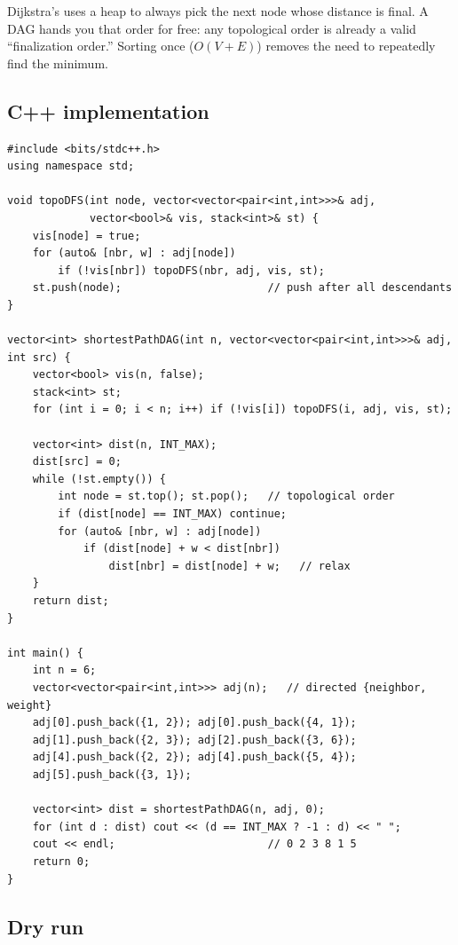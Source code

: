 \begin{ideabox}
Dijkstra's uses a heap to always pick the next node whose distance is
final. A DAG hands you that order for free: any topological order is
already a valid ``finalization order.'' Sorting once ($O(V+E)$) removes
the need to repeatedly find the minimum.
\end{ideabox}

\subsection*{C++ implementation}

\begin{lstlisting}
#include <bits/stdc++.h>
using namespace std;

void topoDFS(int node, vector<vector<pair<int,int>>>& adj,
             vector<bool>& vis, stack<int>& st) {
    vis[node] = true;
    for (auto& [nbr, w] : adj[node])
        if (!vis[nbr]) topoDFS(nbr, adj, vis, st);
    st.push(node);                       // push after all descendants
}

vector<int> shortestPathDAG(int n, vector<vector<pair<int,int>>>& adj, int src) {
    vector<bool> vis(n, false);
    stack<int> st;
    for (int i = 0; i < n; i++) if (!vis[i]) topoDFS(i, adj, vis, st);

    vector<int> dist(n, INT_MAX);
    dist[src] = 0;
    while (!st.empty()) {
        int node = st.top(); st.pop();   // topological order
        if (dist[node] == INT_MAX) continue;
        for (auto& [nbr, w] : adj[node])
            if (dist[node] + w < dist[nbr])
                dist[nbr] = dist[node] + w;   // relax
    }
    return dist;
}

int main() {
    int n = 6;
    vector<vector<pair<int,int>>> adj(n);   // directed {neighbor, weight}
    adj[0].push_back({1, 2}); adj[0].push_back({4, 1});
    adj[1].push_back({2, 3}); adj[2].push_back({3, 6});
    adj[4].push_back({2, 2}); adj[4].push_back({5, 4});
    adj[5].push_back({3, 1});

    vector<int> dist = shortestPathDAG(n, adj, 0);
    for (int d : dist) cout << (d == INT_MAX ? -1 : d) << " ";
    cout << endl;                        // 0 2 3 8 1 5
    return 0;
}
\end{lstlisting}

\subsection*{Dry run}

